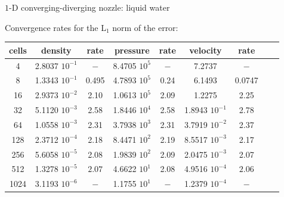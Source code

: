 \documentclass[xcolor=dvipsnames,10pt]{beamer}
\begin{document}
\begin{frame}{$1$-D converging-diverging nozzle: liquid water}
\begin{center}
Convergence rates for the L$_1$ norm of the error:
\end{center}
\begin{table}[H]
\begin{center}
 \begin{tabular}{|c|c|c|c|c|c|c|c|c|}
 \hline
cells & density         & rate   & pressure        & rate    & velocity         & rate     \\ \hline
4    & 2.8037 $10^{-1}$ & $-$    & 8.4705 $10^{5}$ & $-$     & 7.2737           & $-$      \\ \hline
8    & 1.3343 $10^{-1}$ & 0.495 & 4.7893 $10^{5}$ & 0.24 & 6.1493           & 0.0747 \\ \hline
16   & 2.9373 $10^{-2}$ & 2.10 & 1.0613 $10^{5}$ & 2.09  & 1.2275           & 2.25   \\ \hline
32   & 5.1120 $10^{-3}$ & 2.58 & 1.8446 $10^{4}$ & 2.58  & 1.8943 $10^{-1}$ & 2.78   \\ \hline
64   & 1.0558 $10^{-3}$ & 2.31 & 3.7938 $10^{3}$ & 2.31  & 3.7919 $10^{-2}$ & 2.37   \\ \hline
128  & 2.3712 $10^{-4}$ & 2.18 & 8.4471 $10^{2}$ & 2.19  & 8.5517 $10^{-3}$ & 2.17   \\ \hline
256  & 5.6058 $10^{-5}$ & 2.08 & 1.9839 $10^{2}$ & 2.09  & 2.0475 $10^{-3}$ & 2.07   \\ \hline
512  & 1.3278 $10^{-5}$ & $2.07$ & 4.6622 $10^{1}$ & 2.08  & 4.9516 $10^{-4}$ & $2.06$   \\ \hline
1024  & 3.1193 $10^{-6}$ & $-$ & 1.1755 $10^{1}$ & $-$  & 1.2379 $10^{-4}$ & $-$   \\ \hline
\end{tabular}
\end{center}
\end{table}
\end{frame}
\end{document}
